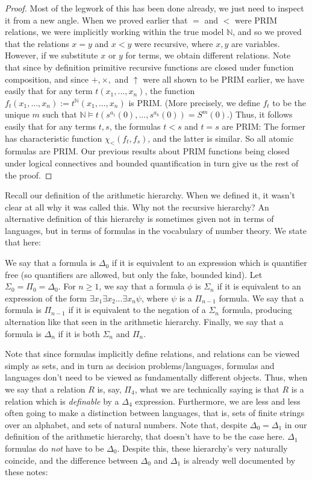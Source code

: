 \begin{proof}
    Most of the legwork of this has been done already, we just need to inspect it from a new angle. When we proved earlier that $=$ and $<$ were PRIM relations, we were implicitly working within the true model $\mathbb{N}$, and so we proved that the relations $x = y$ and $x < y$ were recursive, where $x,y$ are variables. However, if we substitute $x$ or $y$ for terms, we obtain different relations. Note that since by definition primitive recursive functions are closed under function composition, and since $+,\times,$ and $\uparrow$ were all shown to be PRIM earlier, we have easily that for any term $t(x_1,...,x_n)$, the function $f_t(x_1,...,x_n) := t^{\mathbb{N}}(x_1,...,x_n)$ is PRIM. (More precisely, we define $f_t$ to be the unique $m$ such that $\mathbb{N} \models t(s^{a_1}(0),...,s^{a_k}(0)) = S^m(0)$.) Thus, it follows easily that for any terms $t,s$, the formulas $t < s$ and $t = s$ are PRIM: The former has characteristic function $\chi_<(f_t,f_s)$, and the latter is similar. So all atomic formulas are PRIM. Our previous results about PRIM functions being closed under logical connectives and bounded quantification in turn give us the rest of the proof. 
\end{proof}
Recall our definition of the arithmetic hierarchy. When we defined it, it wasn't clear at all why it was called this. Why not the recursive hierarchy? An alternative definition of this hierarchy is sometimes given not in terms of languages, but in terms of formulas in the vocabulary of number theory. We state that here:
\begin{definition}
    We say that a formula is $\Delta_0$ if it is equivalent to an expression which is quantifier free (so quantifiers are allowed, but only the fake, bounded kind). Let $\Sigma_0 = \Pi_0 = \Delta_0$. For $n \geq 1$, we say that a formula $\phi$ is $\Sigma_n$ if it is equivalent to an expression of the form $\exists x_1 \exists x_2 ... \exists x_n \psi$, where $\psi$ is a $\Pi_{n-1}$ formula. We say that a formula is $\Pi_{n-1}$ if it is equivalent to the negation of a $\Sigma_n$ formula, producing alternation like that seen in the arithmetic hierarchy. Finally, we say that a formula is $\Delta_n$ if it is both $\Sigma_n$ and $\Pi_n$.
\end{definition}
Note that since formulas implicitly define relations, and relations can be viewed simply as sets, and in turn as decision problems/languages, formulas and languages don't need to be viewed as fundamentally different objects. Thus, when we say that a relation $R$ is, say, $\Pi_4$, what we are technically saying is that $R$ is a relation which is \textit{definable} by a $\Delta_4$ expression. Furthermore, we are less and less often going to make a distinction between languages, that is, sets of finite strings over an alphabet, and sets of natural numbers. Note that, despite $\Delta_0 = \Delta_1$ in our definition of the arithmetic hierarchy, that doesn't have to be the case here. $\Delta_1$ formulas do \textit{not} have to be $\Delta_0$. Despite this, these hierarchy's very naturally coincide, and the difference between $\Delta_0$ and $\Delta_1$ is already well documented by these notes:
